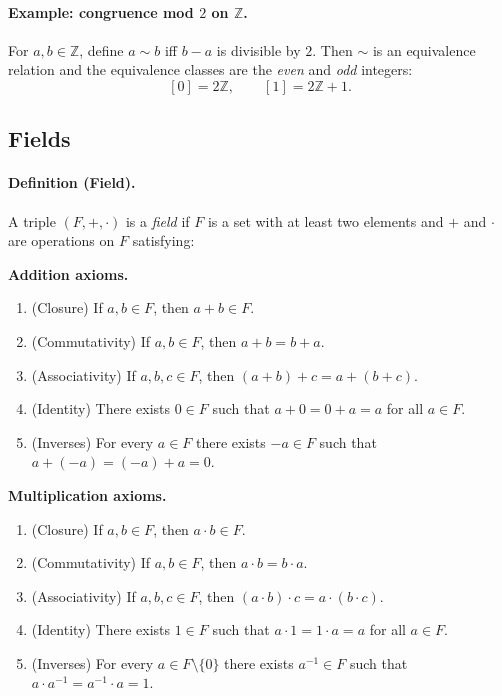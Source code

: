 \documentclass[12pt]{article}
\begin{document}
\paragraph{Example: congruence mod $2$ on $\mathbb{Z}$.}
For $a,b\in\mathbb{Z}$, define $a\sim b$ iff $b-a$ is divisible by $2$. Then $\sim$ is an equivalence relation and the equivalence classes are the \emph{even} and \emph{odd} integers:
\[
[0]=2\mathbb{Z},\qquad [1]=2\mathbb{Z}+1.
\]

\subsection*{Fields}

\paragraph{Definition (Field).}
A triple $(F,+,\cdot)$ is a \emph{field} if $F$ is a set with at least two elements and $+$ and $\cdot$ are operations on $F$ satisfying:

\textbf{Addition axioms.}
\begin{enumerate}[label=\textbf{(A\arabic*)}, leftmargin=3em]
  \item (Closure) If $a,b\in F$, then $a+b\in F$.
  \item (Commutativity) If $a,b\in F$, then $a+b=b+a$.
  \item (Associativity) If $a,b,c\in F$, then $(a+b)+c=a+(b+c)$.
  \item (Identity) There exists $0\in F$ such that $a+0=0+a=a$ for all $a\in F$.
  \item (Inverses) For every $a\in F$ there exists $-a\in F$ such that $a+(-a)=(-a)+a=0$.
\end{enumerate}

\textbf{Multiplication axioms.}
\begin{enumerate}[label=\textbf{(M\arabic*)}, leftmargin=3em]
  \item (Closure) If $a,b\in F$, then $a\cdot b\in F$.
  \item (Commutativity) If $a,b\in F$, then $a\cdot b=b\cdot a$.
  \item (Associativity) If $a,b,c\in F$, then $(a\cdot b)\cdot c=a\cdot (b\cdot c)$.
  \item (Identity) There exists $1\in F$ such that $a\cdot 1=1\cdot a=a$ for all $a\in F$.
  \item (Inverses) For every $a\in F\setminus\{0\}$ there exists $a^{-1}\in F$ such that $a\cdot a^{-1}=a^{-1}\cdot a=1$.
\end{enumerate}
\end{document}
